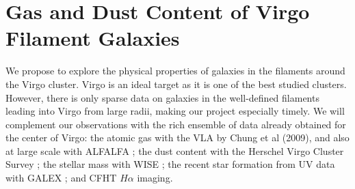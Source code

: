 \documentclass[11pt, preprint]{aastex}
\newcommand{\ha}{$H\alpha$}
\begin{document}
\vspace*{-.8cm}
\section{Gas and Dust Content of Virgo Filament Galaxies}
\vspace*{-.4cm}
We propose to explore the physical properties of
galaxies in the filaments around the Virgo cluster.   
Virgo is an ideal
target as it is one of the best studied clusters.  However, there is
only sparse data on galaxies in the well-defined filaments leading
into Virgo from large radii, making our project especially timely.  We will complement our observations with the rich
ensemble of data already obtained for the center of Virgo: the atomic
gas with the VLA by Chung
et al (2009), and also at large scale with ALFALFA \citep{giovanelli05}; the
dust content with the Herschel Virgo Cluster Survey \citep{davies10};
the stellar mass with WISE \citep{ferrarese12}; the recent star formation
from UV data with GALEX \citep{boselli11}; and CFHT $H\alpha$ imaging.









\end{document}
